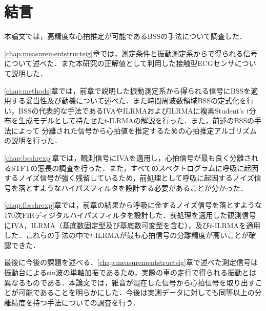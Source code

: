 \chapter{結言}
\label{chap:con}

本論文では，高精度な心拍推定が可能であるBSSの手法について調査した．

\ref{chap:measurementstructsig}章では，測定条件と振動測定系からで得られる信号について述べた．また本研究の正解値として利用した接触型ECGセンサについて説明した．

\ref{chap:methods}章では，前章で説明した振動測定系から得られる信号にBSSを適用する妥当性及び動機について述べた．また時間周波数領域BSSの定式化を行い，BSSの代表的な手法であるIVAやILRMAおよびILRMAに複素Student's $t$分布を生成モデルとして持たせた$t$-ILRMAの解説を行った．また，前述のBSSの手法によって
分離された信号から心拍値を推定するための心拍推定アルゴリズムの説明を行った．

\ref{chap:bsshrexp}章では，観測信号にIVAを適用し，心拍信号が最も良く分離されるSTFTの窓長の調査を行った．また，すべてのスペクトログラムに呼吸に起因するノイズ信号が強く残留しているため，前処理として呼吸に起因するノイズ信号を落とすようなハイパスフィルタを設計する必要があることが分かった．

\ref{chap:fbsshrexp}章では，前章の結果から呼吸に金するノイズ信号を落とすような170次FIRディジタルハイパスフィルタを設計した．前処理を適用した観測信号にIVA，ILRMA（基底数固定型及び基底数可変型を含む），及び$t$-ILRMAを適用した．これらの手法の中で$t$-ILRMAが最も心拍信号の分離精度が高いことが確認できた．

最後に今後の課題を述べる．\ref{chap:measurementstructsig}章で述べた測定信号は振動台によるsin波の単軸加振であるため，実際の車の走行で得られる振動とは異なるものである．本論文では，雑音が混在した信号から心拍信号を取り出すことが可能であることを明らかにした．今後は実測データに対しても同等以上の分離精度を持つ手法についての調査を行う．